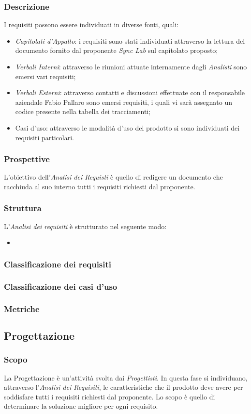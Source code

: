 \subsubsection{Descrizione}\label{2.2.3.3}
I requisiti possono essere individuati in diverse fonti, quali:
\begin{itemize}
	\item \textit{Capitolati d'Appalto}: i requisiti sono stati individuati attraverso la lettura del documento fornito dal proponente \textit{Sync Lab} sul capitolato proposto;
	\item \textit{Verbali Interni}: attraverso le riunioni attuate internamente dagli \textit{Analisti} sono emersi vari requisiti;
	\item \textit{Verbali Esterni}: attraverso contatti e discussioni effettuate con il responsabile aziendale Fabio Pallaro sono emersi requisiti, i quali vi sarà assegnato un codice presente nella tabella dei tracciamenti;
	\item Casi d'uso: attraverso le modalità d'uso del prodotto si sono individuati dei requisiti particolari.
\end{itemize}
\subsubsection{Prospettive}\label{2.2.3.4}
L'obiettivo dell'\textit{Analisi dei Requisti} è quello di redigere un documento che racchiuda al suo interno tutti i requisiti richiesti dal proponente.
\subsubsection{Struttura}\label{2.2.3.5}
L'\textit{Analisi dei requisiti} è strutturato nel seguente modo:
\begin{itemize}
	\item 
\end{itemize}
\subsubsection{Classificazione dei requisiti}\label{2.2.3.6}
\subsubsection{Classificazione dei casi d'uso}\label{2.2.3.7}
\subsubsection{Metriche}\label{2.2.3.8}


\subsection{Progettazione}\label{2.2.4}
\subsubsection{Scopo}\label{2.2.4.1}
La Progettazione è un'attività svolta dai \textit{Progettisti}. In questa fase si individuano, attraverso l'\textit{Analisi dei Requisiti}, le caratteristiche che il prodotto deve avere per soddisfare tutti i requisiti richiesti dal proponente. Lo scopo è quello di determinare la soluzione migliore per ogni requisito.
